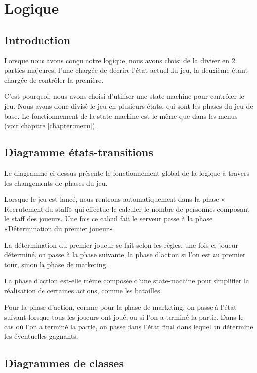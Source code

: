 \chapter{Logique} \label{chapter:logique}
\section{Introduction}
Lorsque nous avons conçu notre logique, nous avons choisi de la diviser en 2
parties majeures, l'une chargée de décrire l'état actuel du jeu, la deuxième
étant chargée de contrôler la première.

C'est pourquoi, nous avons choisi d'utiliser une state machine pour contrôler le jeu.
Nous avons donc divisé le jeu en plusieurs états, qui sont les phases du jeu de base.
Le fonctionnement de la state machine est le même que dans les menus (voir chapitre \ref{chapter:menu}).

\section{Diagramme états-transitions}


Le diagramme ci-dessus présente le fonctionnement global de la logique à travers
les changements de phases du jeu.

Lorsque le jeu est lancé, nous rentrons automatiquement dans la phase «
Recrutement du staff» qui effectue le calculer le nombre de
personnes composant le staff des joueurs.
Une fois ce calcul fait le serveur passe à la phase «Détermination du premier joueur».

La détermination du premier joueur se fait selon les règles, une fois ce joueur
déterminé, on passe à la phase suivante, la phase d'action si l'on est au premier
tour, sinon la phase de marketing.

La phase d'action est-elle même composée d'une state-machine pour simplifier la
réalisation de certaines actions, comme les batailles.

Pour la phase d'action, comme pour la phase de marketing, on passe à l'état
suivant lorsque tous les joueurs ont joué, ou si l'on a terminé la partie.
Dans le cas où l'on a terminé la partie, on passe dans l'état final dans lequel
on détermine les éventuelles gagnants.

\section{Diagrammes de classes}
